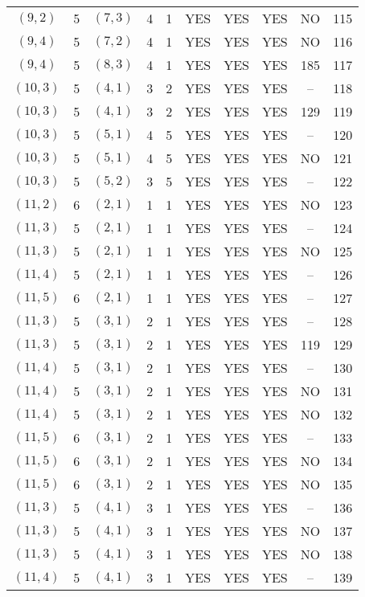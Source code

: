 \begin{longtable}{|c|c|c|c|c|c|c|c|c|c|}
$(9, 2)$ & 5 & $(7, 3)$ & 4 & 1 & YES & YES & YES & NO & 115\\
$(9, 4)$ & 5 & $(7, 2)$ & 4 & 1 & YES & YES & YES & NO & 116\\
$(9, 4)$ & 5 & $(8, 3)$ & 4 & 1 & YES & YES & YES & 185 & 117\\
$(10, 3)$ & 5 & $(4, 1)$ & 3 & 2 & YES & YES & YES & -- & 118\\
$(10, 3)$ & 5 & $(4, 1)$ & 3 & 2 & YES & YES & YES & 129 & 119\\
$(10, 3)$ & 5 & $(5, 1)$ & 4 & 5 & YES & YES & YES & -- & 120\\
$(10, 3)$ & 5 & $(5, 1)$ & 4 & 5 & YES & YES & YES & NO & 121\\
$(10, 3)$ & 5 & $(5, 2)$ & 3 & 5 & YES & YES & YES & -- & 122\\
$(11, 2)$ & 6 & $(2, 1)$ & 1 & 1 & YES & YES & YES & NO & 123\\
$(11, 3)$ & 5 & $(2, 1)$ & 1 & 1 & YES & YES & YES & -- & 124\\
$(11, 3)$ & 5 & $(2, 1)$ & 1 & 1 & YES & YES & YES & NO & 125\\
$(11, 4)$ & 5 & $(2, 1)$ & 1 & 1 & YES & YES & YES & -- & 126\\
$(11, 5)$ & 6 & $(2, 1)$ & 1 & 1 & YES & YES & YES & -- & 127\\
$(11, 3)$ & 5 & $(3, 1)$ & 2 & 1 & YES & YES & YES & -- & 128\\
$(11, 3)$ & 5 & $(3, 1)$ & 2 & 1 & YES & YES & YES & 119 & 129\\
$(11, 4)$ & 5 & $(3, 1)$ & 2 & 1 & YES & YES & YES & -- & 130\\
$(11, 4)$ & 5 & $(3, 1)$ & 2 & 1 & YES & YES & YES & NO & 131\\
$(11, 4)$ & 5 & $(3, 1)$ & 2 & 1 & YES & YES & YES & NO & 132\\
$(11, 5)$ & 6 & $(3, 1)$ & 2 & 1 & YES & YES & YES & -- & 133\\
$(11, 5)$ & 6 & $(3, 1)$ & 2 & 1 & YES & YES & YES & NO & 134\\
$(11, 5)$ & 6 & $(3, 1)$ & 2 & 1 & YES & YES & YES & NO & 135\\
$(11, 3)$ & 5 & $(4, 1)$ & 3 & 1 & YES & YES & YES & -- & 136\\
$(11, 3)$ & 5 & $(4, 1)$ & 3 & 1 & YES & YES & YES & NO & 137\\
$(11, 3)$ & 5 & $(4, 1)$ & 3 & 1 & YES & YES & YES & NO & 138\\
$(11, 4)$ & 5 & $(4, 1)$ & 3 & 1 & YES & YES & YES & -- & 139\\

\end{longtable}
